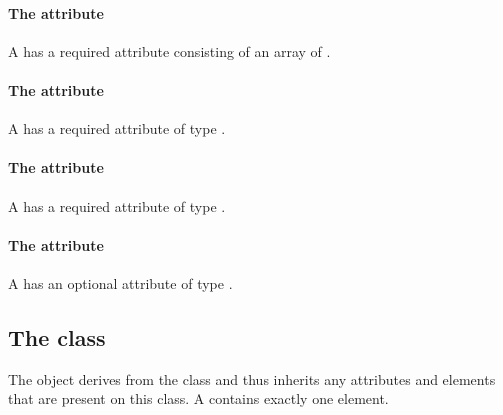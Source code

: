 \paragraph{The \fixttspace{} attribute}

A \ParametricObject has a required attribute 
consisting of an array of .


\paragraph{The \fixttspace{} attribute}

A \ParametricObject has a required attribute  of
type .


\paragraph{The \fixttspace{} attribute}

A \ParametricObject has a required attribute  of type
.


\paragraph{The \fixttspace{} attribute}

A \ParametricObject has an optional attribute  of type
.


\subsection{The  class}
\label{csgeometry-class}




The \CSGeometry object derives from the \GeometryDefinition class and
thus inherits any attributes and elements that are present on this
class.
A \CSGeometry contains exactly one \ListOfCSGObjects element.
